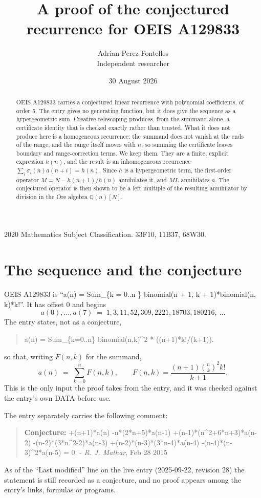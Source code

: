 \documentclass[11pt,a4paper]{article}
\title{A proof of the conjectured recurrence for OEIS A129833}
\author{Adrian Perez Fontelles\\ \small Independent researcher}
\date{30 August 2026}
\theoremstyle{plain}
\theoremstyle{definition}
\begin{document}
\maketitle

\begin{abstract}
OEIS A129833 carries a conjectured linear recurrence with polynomial coefficients, of
order 5. The entry gives no generating function, but it does give the sequence as
a hypergeometric sum. Creative telescoping produces, from the summand alone, a certificate
identity that is checked exactly rather than trusted. What it does not produce here is a
homogeneous recurrence: the summand does not vanish at the ends of the range, and the range
itself moves with $n$, so summing the certificate leaves boundary and range-correction
terms. We keep them. They are a finite, explicit expression $h(n)$, and the result is an
inhomogeneous recurrence $\sum_{i}\sigma_{i}(n)a(n+i)=h(n)$. Since $h$ is a hypergeometric term, the first-order operator $M=N-h(n+1)/h(n)$ annihilates it, and $ML$ annihilates $a$. The conjectured
operator is then shown to be a left multiple of the resulting annihilator by division in
the Ore algebra $\mathbb{Q}(n)[N]$.
\end{abstract}

\noindent\small 2020 Mathematics Subject Classification. 33F10, 11B37, 68W30.\normalsize

\section{The sequence and the conjecture}

OEIS A129833 is ``a(n) = Sum\_\{k = 0..n \} binomial(n + 1, k + 1)*binomial(n, k)*k!''. It has offset $0$ and begins
\[
a(0),\dots,a(7)\;=\;1, 3, 11, 52, 309, 2221, 18703, 180216,\ \dots
\]
The entry states, not as a conjecture,
\begin{quote}\small
a(n) = Sum\_\{k=0..n\} binomial(n,k)\textasciicircum{}2 * ((n+1)*k!/(k+1)).
\end{quote}
so that, writing $F(n,k)$ for the summand,
\begin{equation}\label{eq:sum}
a(n)\;=\;\sum_{k=0}^{n}F(n,k),
\qquad F(n,k)=\frac{\left(n + 1\right) {\binom{n}{k}}^{2} k!}{k + 1} .
\end{equation}
This is the only input the proof takes from the entry, and it was checked against the
entry's own DATA before use.

The entry separately carries the following comment:
\begin{quote}\small
\textbf{Conjecture:} +(n+1)*a(n) -n*(2*n+5)*a(n-1) +(n-1)*(n\textasciicircum{}2+6*n+3)*a(n-2) -(n-2)*(3*n\textasciicircum{}2-2)*a(n-3) +(n-2)*(n-3)*(3*n-4)*a(n-4) -(n-4)*(n-3)\textasciicircum{}2*a(n-5) = 0. - \emph{R. J. Mathar}, Feb 28 2015
\end{quote}
As of the ``Last modified'' line on the live entry (2025-09-22, revision 28) the
statement is still recorded as a conjecture, and no proof appears among the entry's links,
formulas or programs.
\end{document}
